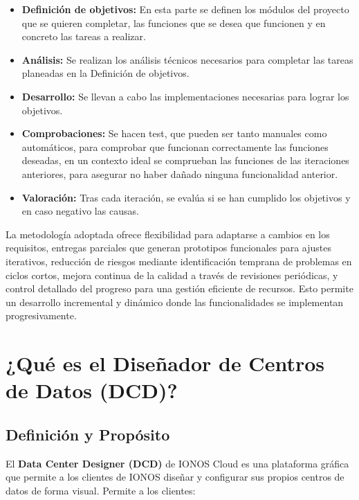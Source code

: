 \begin{itemize}
    \item \textbf{Definición de objetivos:} En esta parte se definen los módulos del proyecto que se quieren completar, las funciones que se desea que funcionen y en concreto las tareas a realizar.
    \item \textbf{Análisis:} Se realizan los análisis técnicos necesarios para completar las tareas planeadas en la Definición de objetivos.
    \item \textbf{Desarrollo:} Se llevan a cabo las implementaciones necesarias para lograr los objetivos.
    \item \textbf{Comprobaciones:} Se hacen test, que pueden ser tanto manuales como automáticos, para comprobar que funcionan correctamente las funciones deseadas, en un contexto ideal se comprueban las funciones de las iteraciones anteriores, para asegurar no haber dañado ninguna funcionalidad anterior.
    \item \textbf{Valoración:} Tras cada iteración, se evalúa si se han cumplido los objetivos y en caso negativo las causas.
\end{itemize}

\vspace{0.25cm}

La metodología adoptada ofrece flexibilidad para adaptarse a cambios en los requisitos, entregas parciales que generan prototipos funcionales para ajustes iterativos, reducción de riesgos mediante identificación temprana de problemas en ciclos cortos, mejora continua de la calidad a través de revisiones periódicas, y control detallado del progreso para una gestión eficiente de recursos. Esto permite un desarrollo incremental y dinámico donde las funcionalidades se implementan progresivamente.


\section{¿Qué es el Diseñador de Centros de Datos (DCD)?}\label{sec:dcd-ionos}

\subsection{Definición y Propósito}

El \textbf{Data Center Designer (DCD)} de IONOS Cloud es una plataforma gráfica que permite a los clientes de IONOS diseñar y configurar sus propios centros de datos de forma visual. Permite a los clientes:

